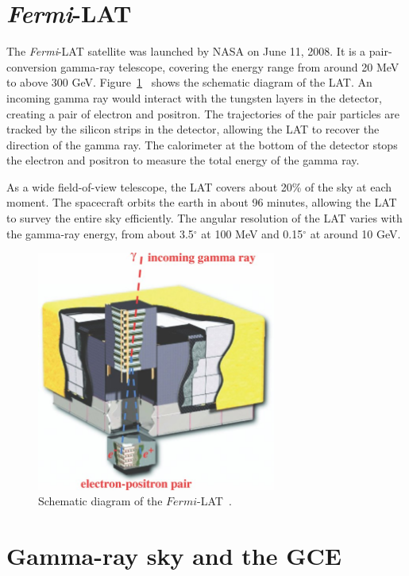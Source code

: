 \documentclass[doublespace,nopageskip]{VTthesis} %
\begin{document}
\section{\textit{Fermi}-LAT}

The \textit{Fermi}-LAT satellite was launched by NASA on June 11, 2008. It is a pair-conversion gamma-ray telescope, covering the energy range from around 20 MeV to above 300 GeV. Figure~\ref{fig:lat}~\cite{2009ApJ...697.1071A} shows the schematic diagram of the LAT. An incoming gamma ray would interact with the tungsten layers in the detector, creating a pair of electron and positron. The trajectories of the pair particles are tracked by the silicon strips in the detector, allowing the LAT to recover the direction of the gamma ray. The calorimeter at the bottom of the detector stops the electron and positron to measure the total energy of the gamma ray.

As a wide field-of-view telescope, the LAT covers about 20\% of the sky at each moment. The spacecraft orbits the earth in about 96 minutes, allowing the LAT to survey the entire sky efficiently. The angular resolution of the LAT varies with the gamma-ray energy, from about 3.5$^\circ$ at 100 MeV and 0.15$^\circ$ at around 10 GeV.

\begin{figure}[htb]
    \centering
    \includegraphics[width=0.7\textwidth]{Figures/Intro/lat.jpg}
    \caption{Schematic diagram of the $Fermi$-LAT~\cite{2009ApJ...697.1071A}.}
    \label{fig:lat}
\end{figure}

\section{Gamma-ray sky and the GCE}
\end{document}
